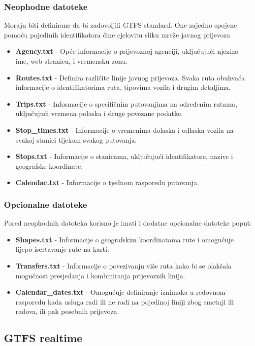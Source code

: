 \documentclass[zavrsnirad]{fer}
\begin{document}
\newpage

\subsubsection{Neophodne datoteke}
Moraju biti definirane da bi zadovoljili GTFS standard. One zajedno spojene pomoću pojedinih identifikatora čine cjelovitu sliku mreže javnog prijevoza
\begin{itemize}
	\item \textbf{Agency.txt} -
	Opće informacije o prijevoznoj agenciji, uključujući njezino ime, web stranicu, i vremensku zonu.
	\item \textbf{Routes.txt} -
	Definira različite linije javnog prijevoza. Svaka ruta obuhvaća informacije o identifikatorima ruta, tipovima vozila i drugim detaljima.
	\item \textbf{Trips.txt} -
	Informacije o specifičnim putovanjima na određenim rutama, uključujući vremena polaska i druge povezane podatke.
	\item \textbf{Stop\_times.txt} -
	Informacije o vremenima dolaska i odlaska vozila na svakoj stanici tijekom svakog putovanja.
	\item \textbf{Stops.txt} -
	Informacije o stanicama, uključujući identifikatore, nazive i geografske koordinate.
	\item \textbf{Calendar.txt} -
	Informacije o tjednom rasporedu putovanja.
\end{itemize}

\subsubsection{Opcionalne datoteke}
Pored neophodnih datoteka korisno je imati i dodatne opcionalne datoteke poput:
\begin{itemize}
	\item \textbf{Shapes.txt} -
	Informacije o geografskim koordinatama rute i omogućuje lijepo iscrtavanje rute na karti.
	\item \textbf{Transfers.txt} -
	Informacije o povezivanju više ruta kako bi se olakšala mogućnost presjedanja i kombiniranja prijevoznih linija.
	\item \textbf{Calendar\_dates.txt} -
	Omogućuje definiranje iznimaka u redovnom rasporedu kada usluga radi ili ne radi na pojedinoj liniji zbog smetnji ili radova, ili pak posebnih prijevoza.
\end{itemize}

\subsection[GTFS-rt]{GTFS realtime}
\end{document}

